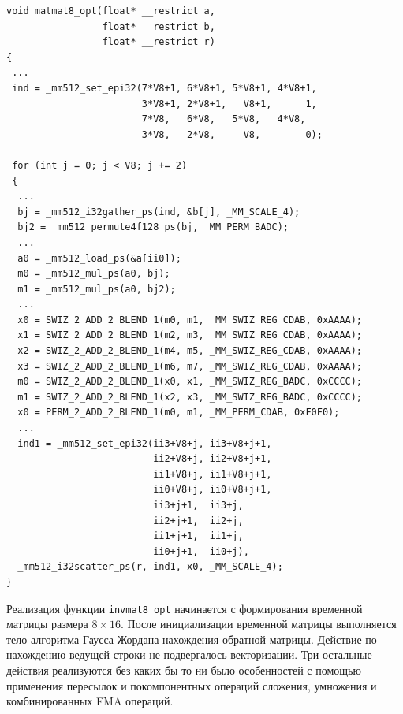 \begin{singlespace}
\begin{lstlisting}[caption={Векторизованная версия перемножения \ \\ матриц размера $8 \times 8$.}, label={lst:text_4_small_matr_matmat_opt}]
void matmat8_opt(float* __restrict a,
                 float* __restrict b,
                 float* __restrict r)
{
 ...
 ind = _mm512_set_epi32(7*V8+1, 6*V8+1, 5*V8+1, 4*V8+1,
                        3*V8+1, 2*V8+1,   V8+1,      1,
                        7*V8,   6*V8,   5*V8,   4*V8,
                        3*V8,   2*V8,     V8,        0);

 for (int j = 0; j < V8; j += 2)
 {
  ...
  bj = _mm512_i32gather_ps(ind, &b[j], _MM_SCALE_4);
  bj2 = _mm512_permute4f128_ps(bj, _MM_PERM_BADC);
  ...
  a0 = _mm512_load_ps(&a[ii0]);
  m0 = _mm512_mul_ps(a0, bj);
  m1 = _mm512_mul_ps(a0, bj2);
  ...
  x0 = SWIZ_2_ADD_2_BLEND_1(m0, m1, _MM_SWIZ_REG_CDAB, 0xAAAA);
  x1 = SWIZ_2_ADD_2_BLEND_1(m2, m3, _MM_SWIZ_REG_CDAB, 0xAAAA);
  x2 = SWIZ_2_ADD_2_BLEND_1(m4, m5, _MM_SWIZ_REG_CDAB, 0xAAAA);
  x3 = SWIZ_2_ADD_2_BLEND_1(m6, m7, _MM_SWIZ_REG_CDAB, 0xAAAA);
  m0 = SWIZ_2_ADD_2_BLEND_1(x0, x1, _MM_SWIZ_REG_BADC, 0xCCCC);
  m1 = SWIZ_2_ADD_2_BLEND_1(x2, x3, _MM_SWIZ_REG_BADC, 0xCCCC);
  x0 = PERM_2_ADD_2_BLEND_1(m0, m1, _MM_PERM_CDAB, 0xF0F0);
  ...
  ind1 = _mm512_set_epi32(ii3+V8+j, ii3+V8+j+1,
                          ii2+V8+j, ii2+V8+j+1,
                          ii1+V8+j, ii1+V8+j+1,
                          ii0+V8+j, ii0+V8+j+1,
                          ii3+j+1,  ii3+j,
                          ii2+j+1,  ii2+j,
                          ii1+j+1,  ii1+j,
                          ii0+j+1,  ii0+j),
  _mm512_i32scatter_ps(r, ind1, x0, _MM_SCALE_4);
}
\end{lstlisting}
\end{singlespace}

Реализация функции \texttt{invmat8\_opt} начинается с формирования временной матрицы размера $8 \times 16$.
После инициализации временной матрицы выполняется тело алгоритма Гаусса-Жордана нахождения обратной матрицы.
Действие по нахождению ведущей строки не подвергалось векторизации.
Три остальные действия реализуются без каких бы то ни было особенностей с помощью применения пересылок и покомпонентных операций сложения, умножения и комбинированных FMA операций.

